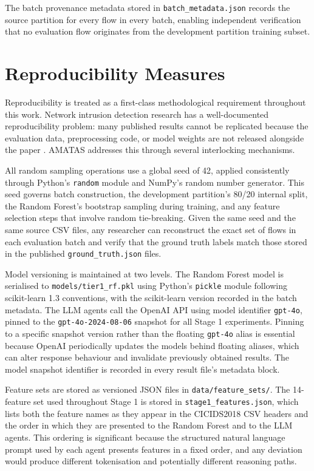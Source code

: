 The batch provenance metadata stored in \texttt{batch\_metadata.json} records the source partition for every flow in every batch, enabling independent verification that no evaluation flow originates from the development partition training subset.

\section{Reproducibility Measures}
\label{sec:reproducibility}

Reproducibility is treated as a first-class methodological requirement throughout this work. Network intrusion detection research has a well-documented reproducibility problem: many published results cannot be replicated because the evaluation data, preprocessing code, or model weights are not released alongside the paper \autocite{Kenyon2020, Ring2019}. AMATAS addresses this through several interlocking mechanisms.

All random sampling operations use a global seed of 42, applied consistently through Python's \texttt{random} module and NumPy's random number generator. This seed governs batch construction, the development partition's 80/20 internal split, the Random Forest's bootstrap sampling during training, and any feature selection steps that involve random tie-breaking. Given the same seed and the same source CSV files, any researcher can reconstruct the exact set of flows in each evaluation batch and verify that the ground truth labels match those stored in the published \texttt{ground\_truth.json} files.

Model versioning is maintained at two levels. The Random Forest model is serialised to \texttt{models/tier1\_rf.pkl} using Python's \texttt{pickle} module following scikit-learn 1.3 conventions, with the scikit-learn version recorded in the batch metadata. The LLM agents call the OpenAI API using model identifier \texttt{gpt-4o}, pinned to the \texttt{gpt-4o-2024-08-06} snapshot for all Stage 1 experiments. Pinning to a specific snapshot version rather than the floating \texttt{gpt-4o} alias is essential because OpenAI periodically updates the models behind floating aliases, which can alter response behaviour and invalidate previously obtained results. The model snapshot identifier is recorded in every result file's metadata block.

Feature sets are stored as versioned JSON files in \texttt{data/feature\_sets/}. The 14-feature set used throughout Stage 1 is stored in \texttt{stage1\_features.json}, which lists both the feature names as they appear in the CICIDS2018 CSV headers and the order in which they are presented to the Random Forest and to the LLM agents. This ordering is significant because the structured natural language prompt used by each agent presents features in a fixed order, and any deviation would produce different tokenisation and potentially different reasoning paths.

